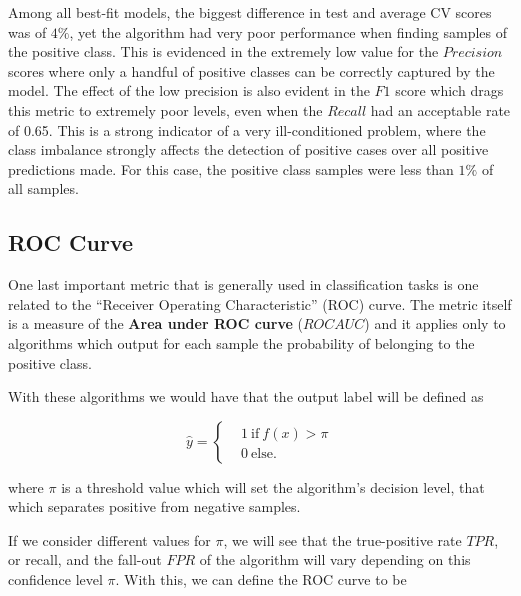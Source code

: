 Among all best-fit models, the biggest difference in test and average CV scores was of $4\%$, yet the algorithm had very poor performance when finding samples of the positive class.
This is evidenced in the extremely low value for the $Precision$ scores where only a handful of positive classes can be correctly captured by the model.
The effect of the low precision is also evident in the $F1$ score which drags this metric to extremely poor levels, even when the $Recall$ had an acceptable rate of 0.65.
This is a strong indicator of a very ill-conditioned problem, where the class imbalance strongly affects the detection of positive cases over all positive predictions made.
For this case, the positive class samples were less than $1\%$ of all samples.


\subsection{ROC Curve}\label{sub:roc_curve}

One last important metric that is generally used in classification tasks is one related to the ``Receiver Operating Characteristic'' (ROC) curve.
The metric itself is a measure of the \textbf{Area under ROC curve} ($ROC AUC$) and it applies only to algorithms which output for each sample the probability of belonging to the positive class.

With these algorithms we would have that the output label will be defined as

\begin{equation}
\hat{y} =
\begin{cases}
&1 \ \mbox{if} \ f(x) > \pi \\
&0 \ \mbox{else}.
\end{cases}
\end{equation}

where $\pi$ is a threshold value which will set the algorithm's decision level, that which separates positive from negative samples.

If we consider different values for $\pi$, we will see that the true-positive rate $TPR$, or recall, and the fall-out $FPR$ of the algorithm will vary depending on this confidence level $\pi$.
With this, we can define the ROC curve to be

